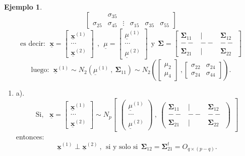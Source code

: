 \documentclass[
]{book}
\providecommand{\tightlist}{%
  \setlength{\itemsep}{0pt}\setlength{\parskip}{0pt}}
\theoremstyle{definition}
\theoremstyle{definition}
\newtheorem{example}{Ejemplo}[chapter]
\theoremstyle{definition}
\theoremstyle{definition}
\theoremstyle{remark}
\begin{document}
\begin{example}
\[\begin{bmatrix}
&\sigma_{35}  \\
\sigma_{25} &\sigma_{45} & \vdots & \sigma_{15} &\sigma_{35}
&\sigma_{55}  
\end{bmatrix}
\]
\[
\text{es decir}: \ \ \underline{\mathbf{x}}=\begin{bmatrix}
\underline{\mathbf{x}}^{(1)} \\ \cdots \\ \underline{\mathbf{x}}^{(2)}
\end{bmatrix} \ \ , \ \ 
\underline{\mu}=\begin{bmatrix}
\underline{\mu}^{(1)} \\ \cdots \\ \underline{\mu}^{(2)}
\end{bmatrix}\ \ \text{y} \ \ 
\mathbf{\Sigma}= 
 \begin{bmatrix}
\mathbf{\Sigma}_{11} & | & \mathbf{\Sigma}_{12} \\
-- & -- & -- \\
\mathbf{\Sigma}_{21} & | & \mathbf{\Sigma}_{22}
\end{bmatrix}
\]
\[
\text{luego}: \ \ \underline{\mathbf{x}}^{(1)} 
\sim  N_2\left(\underline{\mu}^{(1)}\ , \ \mathbf{\Sigma}_{11}\right)\sim N_2 \left(\begin{bmatrix}
\mu_2 \\ \mu_4 
\end{bmatrix}\ , \begin{bmatrix}
\sigma_{22} & \sigma_{24}\\
\sigma_{24} & \sigma_{44}
\end{bmatrix} \right).
\]
\end{example}

\begin{enumerate}
\def\labelenumi{\arabic{enumi}.}
\setcounter{enumi}{4}
\tightlist
\item
  a).
  \[ 
  \text{Si}, \ \ \ \underline{\mathbf{x}}=\begin{bmatrix}
  \underline{\mathbf{x}}^{(1)} \\ \cdots \\ \underline{\mathbf{x}}^{(2)}
  \end{bmatrix} \sim N_{p} \begin{bmatrix}
  \begin{pmatrix}
  \underline{\mu}^{(1)} \\ \cdots \\ \underline{\mu}^{(2)}
  \end{pmatrix} \ , \ \begin{pmatrix}
  \mathbf{\Sigma}_{11} & | & \mathbf{\Sigma}_{12} \\
  -- & -- & -- \\
  \mathbf{\Sigma}_{21} & | & \mathbf{\Sigma}_{22}
  \end{pmatrix}
  \end{bmatrix}
  \]
  entonces:
  \begin{equation}
  \underline{\mathbf{x}}^{(1)} \perp \underline{\mathbf{x}}^{(2)}\ , \ \ \text{si y solo si} \ \ \mathbf{\Sigma}_{12}=\mathbf{\Sigma}_{21}^t=O_{q\times (p-q)}.
  \label{eq:prop-5a}
  \end{equation}
\end{enumerate}
\end{document}
